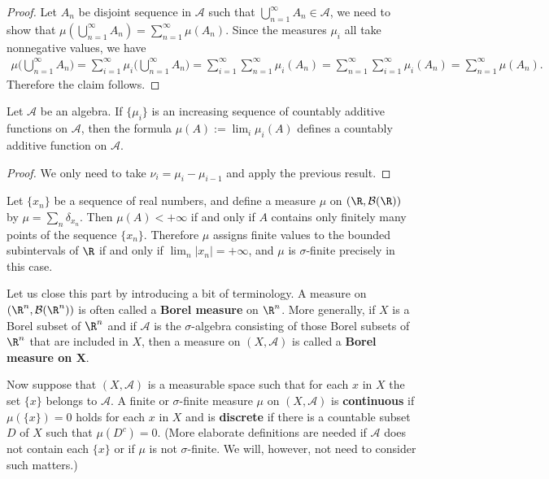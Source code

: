 \begin{proof}
Let $A_n$ be disjoint sequence in $\mathcal{A}$ such that $\bigcup_{n=1}^{\infty}A_n\in\mathcal{A}$, we need to show that $\mu(\bigcup_{n=1}^{\infty}A_n)=\sum_{n=1}^{\infty}\mu(A_n)$. Since the measures $\mu_i$ all take nonnegative values, we have
\begin{align*}
\mu\Big(\bigcup_{n=1}^{\infty}A_n\Big)=\sum_{i=1}^{\infty}\mu_i\Big(\bigcup_{n=1}^{\infty}A_n\Big)=\sum_{i=1}^{\infty}\sum_{n=1}^{\infty}\mu_i(A_n)=\sum_{n=1}^{\infty}\sum_{i=1}^{\infty}\mu_i(A_n)=\sum_{n=1}^{\infty}\mu(A_n).
\end{align*}
Therefore the claim follows.
\end{proof}
\begin{corollary}
Let $\mathcal{A}$ be an algebra. If $\{\mu_i\}$ is an increasing sequence of countably additive functions on $\mathcal{A}$, then the formula $\mu(A):=\lim_i\mu_i(A)$ defines a countably additive function on $\mathcal{A}$.
\end{corollary}
\begin{proof}
We only need to take $\nu_i=\mu_{i}-\mu_{i-1}$ and apply the previous result.
\end{proof}
\begin{example}
Let $\{x_n\}$ be a sequence of real numbers, and define a measure $\mu$ on $(\R,\mathcal{B}(\R))$ by $\mu=\sum_{n}\delta_{x_n}$. Then $\mu(A)<+\infty$ if and only if $A$ contains only finitely many points of the sequence $\{x_n\}$. Therefore $\mu$ assigns finite values to the bounded subintervals of $\R$ if and only if $\lim_n|x_n|=+\infty$, and $\mu$ is $\sigma$-finite precisely in this case.
\end{example}
Let us close this part by introducing a bit of terminology. A measure on $(\R^n,\mathcal{B}(\R^n))$ is often called a \textbf{Borel measure} on $\R^n$. More generally, if $X$ is a Borel subset of $\R^n$ and if $\mathcal{A}$ is the $\sigma$-algebra consisting of those Borel subsets of $\R^n$ that are included in $X$, then a measure on $(X,\mathcal{A})$ is called a \textbf{Borel measure on $\bm{X}$}.\par
Now suppose that $(X,\mathcal{A})$ is a measurable space such that for each $x$ in $X$ the set $\{x\}$ belongs to $\mathcal{A}$. A finite or $\sigma$-finite measure $\mu$ on $(X,\mathcal{A})$ is \textbf{continuous} if $\mu(\{x\})=0$ holds for each $x$ in $X$ and is \textbf{discrete} if there is a countable subset $D$ of $X$ such that $\mu(D^c)=0$. (More elaborate definitions are needed if $\mathcal{A}$ does not contain each $\{x\}$ or if $\mu$ is not $\sigma$-finite. We will, however, not need to consider such matters.)
